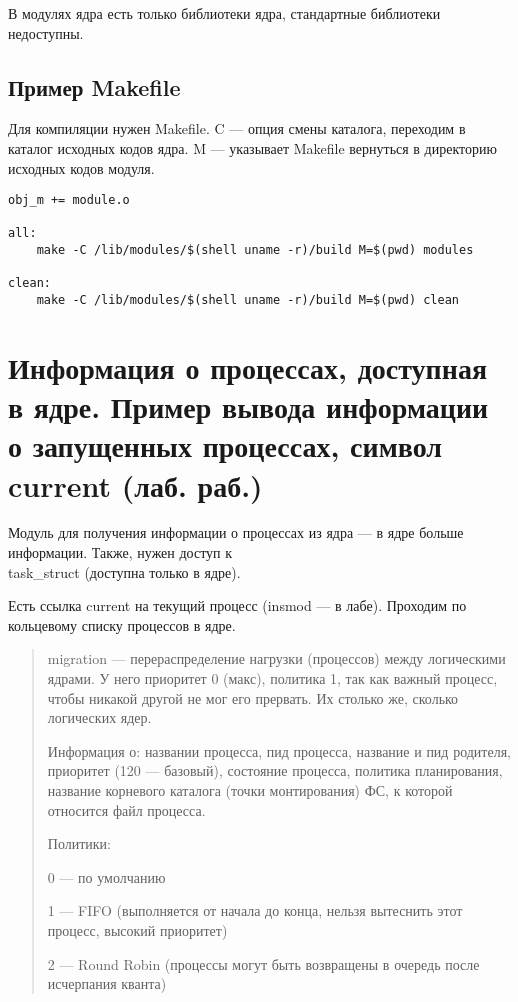 В модулях ядра есть только библиотеки ядра, стандартные библиотеки недоступны. 

\subsection{Пример Makefile}

Для компиляции нужен Makefile. C --- опция смены каталога, переходим в каталог исходных кодов ядра. M --- указывает Makefile вернуться в директорию исходных кодов модуля.

\begin{lstlisting}
obj_m += module.o

all:
    make -C /lib/modules/$(shell uname -r)/build M=$(pwd) modules
    
clean:
    make -C /lib/modules/$(shell uname -r)/build M=$(pwd) clean
\end{lstlisting}

\section{Информация о процессах, доступная в ядре. Пример вывода информации о запущенных процессах, символ current (лаб. раб.)}

Модуль для получения информации о процессах из ядра --- в ядре больше информации. Также, нужен доступ к \\ task\_struct (доступна только в ядре).

Есть ссылка current на текущий процесс (insmod --- в лабе). Проходим по кольцевому списку процессов в ядре. 

\begin{quote}
	migration --- перераспределение нагрузки (процессов) между логическими ядрами. У него приоритет 0 (макс), политика 1, так как важный процесс, чтобы никакой другой не мог его прервать. Их столько же, сколько логических ядер.
	
	Информация о: названии процесса, пид процесса, название и пид родителя, приоритет (120 --- базовый), состояние процесса, политика планирования, название корневого каталога (точки монтирования) ФС, к которой относится файл процесса.
	
	Политики:
	
	0 --- по умолчанию
	
	1 --- FIFO (выполняется от начала до конца, нельзя вытеснить этот процесс, высокий приоритет)
	
	2 --- Round Robin (процессы могут быть возвращены в очередь после исчерпания кванта)
\end{quote}



